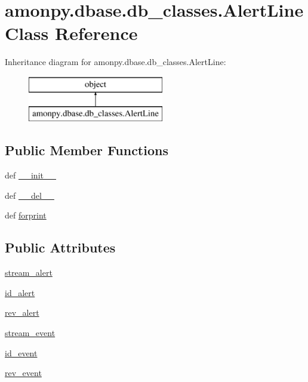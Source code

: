 \hypertarget{classamonpy_1_1dbase_1_1db__classes_1_1_alert_line}{\section{amonpy.\-dbase.\-db\-\_\-classes.\-Alert\-Line Class Reference}
\label{classamonpy_1_1dbase_1_1db__classes_1_1_alert_line}
}
Inheritance diagram for amonpy.\-dbase.\-db\-\_\-classes.\-Alert\-Line\-:\begin{figure}[H]
\begin{center}
\leavevmode
\includegraphics[height=2.000000cm]{classamonpy_1_1dbase_1_1db__classes_1_1_alert_line}
\end{center}
\end{figure}
\subsection*{Public Member Functions}
\begin{DoxyCompactItemize}
\item 
def \hyperlink{classamonpy_1_1dbase_1_1db__classes_1_1_alert_line_aef4fa3d64975b679df843c3b1cbcfb8e}{\-\_\-\-\_\-init\-\_\-\-\_\-}
\item 
def \hyperlink{classamonpy_1_1dbase_1_1db__classes_1_1_alert_line_a835e26d237c6fa3c78cddc18b2b8d9ff}{\-\_\-\-\_\-del\-\_\-\-\_\-}
\item 
def \hyperlink{classamonpy_1_1dbase_1_1db__classes_1_1_alert_line_a3ab6ec496d54160c4069f47237776646}{forprint}
\end{DoxyCompactItemize}
\subsection*{Public Attributes}
\begin{DoxyCompactItemize}
\item 
\hyperlink{classamonpy_1_1dbase_1_1db__classes_1_1_alert_line_ab24de2d5e3f4418dc2b9c6c68c42ae41}{stream\-\_\-alert}
\item 
\hyperlink{classamonpy_1_1dbase_1_1db__classes_1_1_alert_line_afe155f528e6c01f810d95264e77ccee6}{id\-\_\-alert}
\item 
\hyperlink{classamonpy_1_1dbase_1_1db__classes_1_1_alert_line_acb48088679522c813ac7ad21924f98a1}{rev\-\_\-alert}
\item 
\hyperlink{classamonpy_1_1dbase_1_1db__classes_1_1_alert_line_a6081f9c41c7c34d54a565407f2308175}{stream\-\_\-event}
\item 
\hyperlink{classamonpy_1_1dbase_1_1db__classes_1_1_alert_line_abbf3c5c8916d6a655444f44a841705f7}{id\-\_\-event}
\item 
\hyperlink{classamonpy_1_1dbase_1_1db__classes_1_1_alert_line_a5180b21c821a1eb9540d88623e11378f}{rev\-\_\-event}
\end{DoxyCompactItemize}
